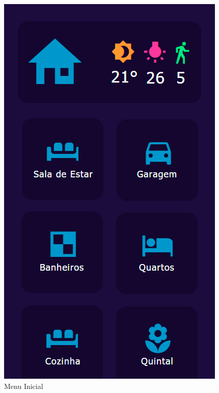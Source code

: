                 \graphicspath{ {figuras/} }
                \begin{figure}[h]
                    \centering
                    \includegraphics[scale=0.35]{2}
                    \caption{Menu Inicial}
                    \label{fig:menu}
                \end{figure}

